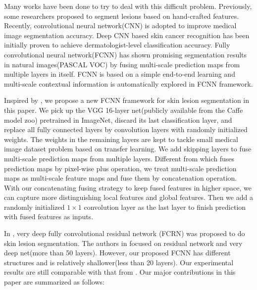 \documentclass{article}
\begin{document}
Many works have been done to try to deal with this difficult problem. Previously, some researchers proposed to segment lesions based on hand-crafted features\cite{Tommasi2006,Celebi2007362,Ganster2001,Schaefer2014,Jafari2016ICIP}. Recently, convolutional neural network(CNN) is adopted to improve medical image segmentation accuracy\cite{ronneberger2015unet,Chen2017135DCAN}. Deep CNN based skin cancer recognition has been initially proven to achieve dermatologist-level classification accuracy\cite{Esteva2017DermatologicstLevel-Nature}.  Fully convolutional neural network(FCNN) has shown promising segmentation results in natural images(PASCAL VOC) by fusing multi-scale prediction maps from multiple layers in itself\cite{Long2015FullyCN}. FCNN is based on a simple end-to-end learning and multi-scale contextual information is automatically explored in FCNN framework.

Inspired by \cite{Long2015FullyCN}, we propose a new FCNN framework for skin lesion segmentation in this paper. We pick up the VGG 16-layer net(publicly available from the Caffe model zoo) pretrained in ImageNet, discard its last classification layer, and replace all fully connected layers by convolution layers with randomly initialized weights. The weights in the remaining layers are kept to tackle small medical image dataset problem based on transfer learning. We add skipping layers to fuse multi-scale prediction maps from multiple layers. Different from \cite{Long2015FullyCN} which fuses prediction maps by pixel-wise plus operation, we treat multi-scale prediction maps as multi-scale feature maps and fuse them by concatenation operation. With our concatenating fusing strategy to keep fused features in higher space, we can capture more distinguishing local features and global features. Then we add a randomly initialized $1\times1$ convolution layer as the last layer to finish prediction with fused features as inputs. 

In \cite{Yu2016ResidualNet}, very deep fully convolutional residual network (FCRN) was proposed to do skin lesion segmentation. The authors in \cite{Yu2016ResidualNet} focused on residual network and very deep net(more than 50 layers). However, our proposed FCNN has different structures and is relatively shallower(less than 20 layers). Our experimental results are still comparable with that from \cite{Yu2016ResidualNet}. Our major contributions in this paper are summarized as follows:
\end{document}
